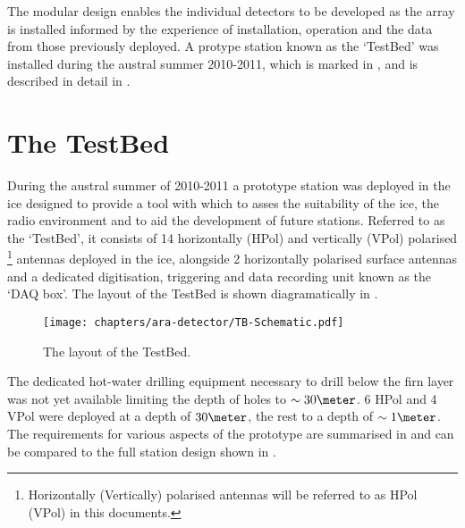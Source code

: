 The modular design enables the individual detectors to be developed as the array is installed informed by the experience of installation, operation and the data from those previously deployed. A protype station known as the `TestBed' was installed during the austral summer 2010-2011, which is marked in , and is described in detail in . 



\section{The TestBed}
\label{sec:ara-detector:TestBed}

During the austral summer of 2010-2011 a prototype station was deployed in the ice designed to provide a tool with which to asses the suitability of the ice, the radio environment and to aid the development of future stations. Referred to as the `TestBed', it consists of 14 horizontally (HPol) and vertically (VPol) polarised \footnote{Horizontally (Vertically) polarised antennas will be referred to as HPol (VPol) in this documents.} antennas deployed in the ice, alongside 2 horizontally polarised surface antennas and a dedicated digitisation, triggering and data recording unit known as the `DAQ box'. The layout of the TestBed is shown diagramatically in .

\begin{figure}[htpb]
  \centering
  \texttt{[image: chapters/ara-detector/TB-Schematic.pdf]}
  \caption{The layout of the TestBed.}
  \label{fig:ara-detector:TestBed:Schematic}
\end{figure}

The dedicated hot-water drilling equipment necessary to drill below the firn layer was not yet available limiting the depth of holes to $\sim 30 \meter$. 6 HPol and 4 VPol were deployed at a depth of $30 \meter$, the rest to a depth of $\sim 1 \meter$. The requirements for various aspects of the prototype are summarised in  and can be compared to the full station design shown in .


